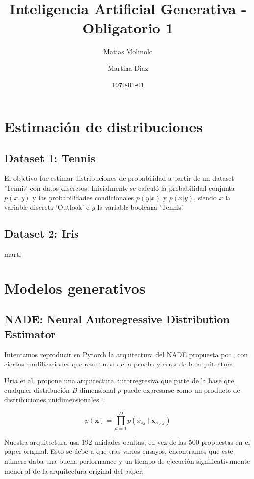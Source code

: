 \documentclass[11pt]{article}
\title{Inteligencia Artificial Generativa - Obligatorio 1}
\author{Matias Molinolo \and Martina Diaz}
\date{\today}
\begin{document}
\maketitle
\thispagestyle{empty}
\newpage
\tableofcontents
\newpage

\section{Estimación de distribuciones}

\subsection{Dataset 1: Tennis}
El objetivo fue estimar distribuciones de probabilidad a partir de un dataset 'Tennis' con datos discretos. Inicialmente se calculó la probabilidad conjunta $p(x,y)$ y las probabilidades condicionales $p(y|x)$ y $p(x|y)$, siendo $x$ la variable discreta 'Outlook' e $y$ la variable booleana 'Tennis'. 

\subsection{Dataset 2: Iris}
marti

\section{Modelos generativos}
\subsection{NADE: Neural Autoregressive Distribution Estimator}

Intentamos reproducir en Pytorch la arquitectura del NADE propuesta por \cite{nade}, con ciertas modificaciones que resultaron de la prueba y error de la arquitectura.

Uria et al. propone una arquitectura autorregresiva que parte de la base que cualquier distribución $D$-dimensional $p$ puede expresarse como un producto de distribuciones unidimensionales \cite{nade}:

$$
p(\boldsymbol{x}) = \prod_{d=1}^{D}p(x_{o_d} \mid \boldsymbol{x}_{o_{<d}})
$$

Nuestra arquitectura usa 192 unidades ocultas, en vez de las 500 propuestas en el paper original. Esto se debe a que tras varios ensayos, encontramos que este número daba una buena performance y un tiempo de ejecución significativamente menor al de la arquitectura original del paper. 
\end{document}
